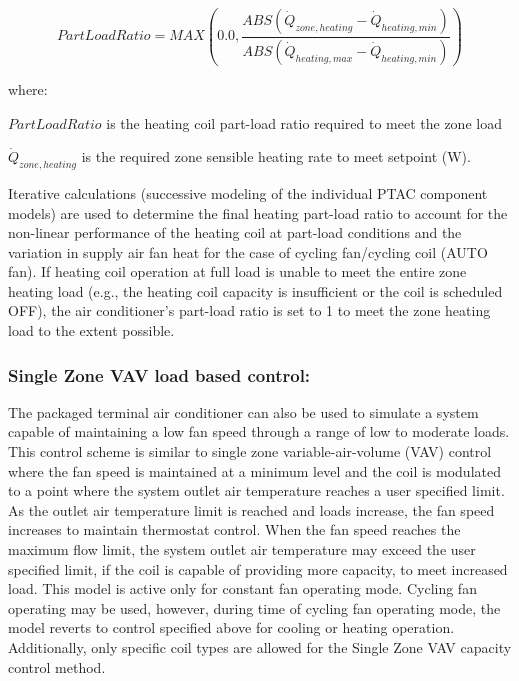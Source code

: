 \begin{equation}
  PartLoadRatio = MAX \left( 0.0, \frac{ABS \left( \dot{Q}_{zone,heating} - \dot{Q}_{heating,min} \right)}{ABS \left( \dot{Q}_{heating,max} - \dot{Q}_{heating,min} \right)} \right)
\end{equation}

where:

\(PartLoadRatio\) is the heating coil part-load ratio required to meet the zone load

\(\dot{Q}_{zone,heating}\) is the required zone sensible heating rate to meet setpoint (W).

Iterative calculations (successive modeling of the individual PTAC component models) are used to determine the final heating part-load ratio to account for the non-linear performance of the heating coil at part-load conditions and the variation in supply air fan heat for the case of cycling fan/cycling coil (AUTO fan). If heating coil operation at full load is unable to meet the entire zone heating load (e.g., the heating coil capacity is insufficient or the coil is scheduled OFF), the air conditioner's part-load ratio is set to 1 to meet the zone heating load to the extent possible.

\subsubsection{Single Zone VAV load based control:}\label{single-zone-vav-load-based-control}

The packaged terminal air conditioner can also be used to simulate a system capable of maintaining a low fan speed through a range of low to moderate loads. This control scheme is similar to single zone variable-air-volume (VAV) control where the fan speed is maintained at a minimum level and the coil is modulated to a point where the system outlet air temperature reaches a user specified limit. As the outlet air temperature limit is reached and loads increase, the fan speed increases to maintain thermostat control. When the fan speed reaches the maximum flow limit, the system outlet air temperature may exceed the user specified limit, if the coil is capable of providing more capacity, to meet increased load. This model is active only for constant fan operating mode. Cycling fan operating may be used, however, during time of cycling fan operating mode, the model reverts to control specified above for cooling or heating operation. Additionally, only specific coil types are allowed for the Single Zone VAV capacity control method.

